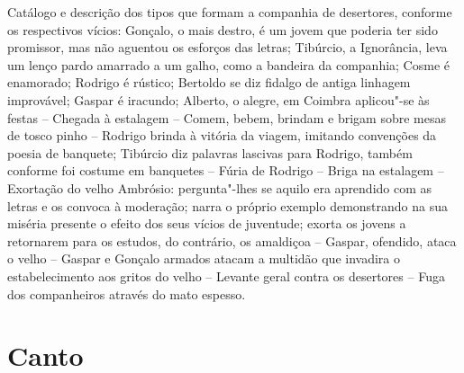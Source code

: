 {\footnotesize\noindent Catálogo e descrição dos tipos que formam a companhia de desertores, conforme os respectivos vícios:  \index{\Tipos}
Gonçalo, o mais destro, é um jovem que poderia ter sido promissor, mas
não aguentou os esforços das letras; Tibúrcio, a Ignorância, leva um lenço pardo amarrado
a um galho, como a bandeira da companhia; Cosme é enamorado; Rodrigo é
rústico; Bertoldo se diz fidalgo de antiga linhagem improvável; Gaspar
é iracundo; Alberto, o alegre, em Coimbra aplicou"-se às festas --
Chegada à estalagem -- Comem, bebem, brindam e brigam sobre mesas de tosco pinho --
Rodrigo brinda à vitória da viagem, imitando convenções da poesia de banquete; Tibúrcio diz palavras
lascivas para Rodrigo, também conforme foi costume em banquetes -- Fúria de Rodrigo -- Briga na estalagem --
Exortação do velho Ambrósio: pergunta"-lhes se aquilo era aprendido com as letras e os convoca à moderação;
narra o próprio exemplo demonstrando na sua miséria presente o efeito dos
seus vícios de juventude; exorta os jovens a retornarem para os estudos,  do contrário,
os amaldiçoa -- Gaspar, ofendido, ataca o velho -- Gaspar e Gonçalo armados
atacam a multidão que invadira o estabelecimento aos gritos do velho --
Levante geral contra os desertores -- Fuga dos companheiros através do mato espesso.}

\chapter{Canto }

